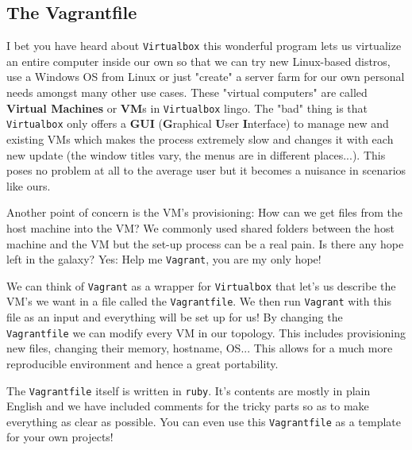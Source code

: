 \documentclass[12pt]{article}
\newcommand{\newpar} {
    \vskip 1cm
}
\begin{document}
	\subsection{The Vagrantfile}
		I bet you have heard about \texttt{Virtualbox} this wonderful program lets us virtualize an entire computer inside our own so that we can try new Linux-based distros, use a Windows OS from Linux or just "create" a server farm for our own personal needs amongst many other use cases. These "virtual computers" are called \textbf{Virtual Machines} or \textbf{VM}s in \texttt{Virtualbox} lingo. The "bad" thing is that \texttt{Virtualbox} only offers a \textbf{GUI} (\textbf{G}raphical \textbf{U}ser \textbf{I}nterface) to manage new and existing VMs which makes the process extremely slow and changes it with each new update (the window titles vary, the menus are in different places...). This poses no problem at all to the average user but it becomes a nuisance in scenarios like ours.
		\newpar
		Another point of concern is the VM's provisioning: How can we get files from the host machine into the VM? We commonly used shared folders between the host machine and the VM but the set-up process can be a real pain. Is there any hope left in the galaxy? Yes: Help me \texttt{Vagrant}, you are my only hope!
		\newpar
		We can think of \texttt{Vagrant} as a wrapper for \texttt{Virtualbox} that let's us describe the VM's we want in a file called the \texttt{Vagrantfile}. We then run \texttt{Vagrant} with this file as an input and everything will be set up for us! By changing the \texttt{Vagrantfile} we can modify every VM in our topology. This includes provisioning new files, changing their memory, hostname, OS... This allows for a much more reproducible environment and hence a great portability.
		\newpar
		The \texttt{Vagrantfile} itself is written in \texttt{ruby}. It's contents are mostly in plain English and we have included comments for the tricky parts so as to make everything as clear as possible. You can even use this \texttt{Vagrantfile} as a template for your own projects!
\end{document}
